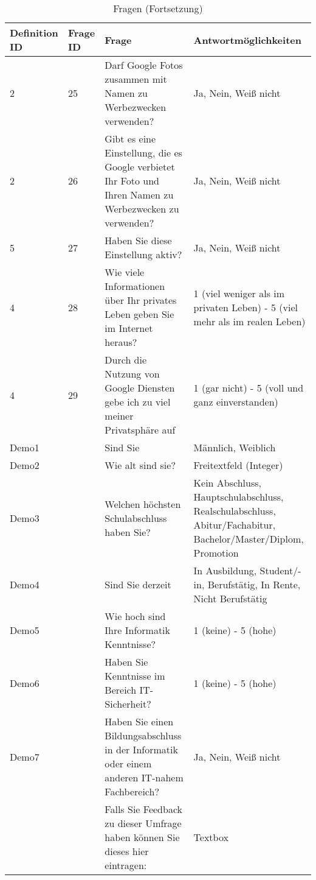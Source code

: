 \begin{table}
	\begin{tabular}[]{ p{1.5cm} | p{1.5cm} | p{5cm} | p{5cm} }
	\hline
	Definition ID & Frage ID & Frage & Antwortmöglichkeiten \\
	\hline \hline
	2 & 25 & Darf Google Fotos zusammen mit Namen zu Werbezwecken verwenden? & Ja, Nein, Weiß nicht\\
	\hline
	2 & 26 & Gibt es eine Einstellung, die es Google verbietet Ihr Foto und Ihren Namen zu Werbezwecken zu verwenden? & Ja, Nein, Weiß nicht\\
	\hline
	5 & 27 & Haben Sie diese Einstellung aktiv? & Ja, Nein, Weiß nicht\\
	\hline
	4 & 28 & Wie viele Informationen über Ihr privates Leben geben Sie im Internet heraus? & 1 (viel weniger als im privaten Leben) - 5 (viel mehr als im realen Leben)\\
	\hline
	4 & 29 & Durch die Nutzung von Google Diensten gebe ich zu viel meiner Privatsphäre auf & 1 (gar nicht) - 5 (voll und ganz einverstanden)\\
	\hline
	Demo1 & & Sind Sie & Männlich, Weiblich\\
	\hline
	Demo2 & & Wie alt sind sie? & Freitextfeld (Integer)\\
	\hline
	Demo3 & & Welchen höchsten Schulabschluss haben Sie? & Kein Abschluss, Hauptschulabschluss, Realschulabschluss, Abitur/Fachabitur, Bachelor/Master/Diplom, Promotion\\
	\hline
	Demo4 & & Sind Sie derzeit & In Ausbildung, Student/-in, Berufstätig, In Rente, Nicht Berufstätig\\
	\hline
	Demo5 & & Wie hoch sind Ihre Informatik Kenntnisse? & 1 (keine) - 5 (hohe)\\
	\hline
	Demo6 & & Haben Sie Kenntnisse im Bereich IT-Sicherheit? & 1 (keine) - 5 (hohe)\\
	\hline
	Demo7 & & Haben Sie einen Bildungsabschluss in der Informatik oder einem anderen IT-nahem Fachbereich? & Ja, Nein, Weiß nicht\\
	\hline
	& & Falls Sie Feedback zu dieser Umfrage haben können Sie dieses hier eintragen:& Textbox\\
	\hline	
	\end{tabular}
	\caption{Fragen (Fortsetzung)}
\end{table}